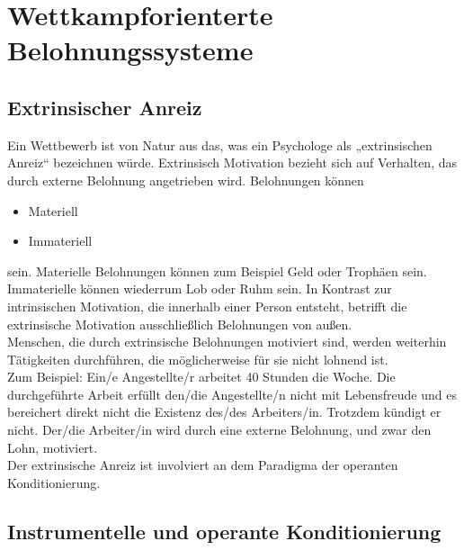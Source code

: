 \chapter{Wettkampforienterte Belohnungssysteme}
\reiter
 
	\section{Extrinsischer Anreiz}
	
Ein Wettbewerb ist von Natur aus das, was ein Psychologe als „extrinsischen Anreiz“ bezeichnen würde.
Extrinsisch Motivation bezieht sich auf Verhalten, das durch externe Belohnung angetrieben wird. Belohnungen können 
  
		\begin{itemize}
			\item Materiell
  		\item Immateriell
		\end{itemize}
		
sein. Materielle Belohnungen können zum Beispiel Geld oder Trophäen sein. Immaterielle können wiederrum Lob oder Ruhm sein. In Kontrast zur intrinsischen Motivation, die innerhalb einer Person entsteht, betrifft die extrinsische Motivation ausschließlich Belohnungen von außen. \\

Menschen, die durch extrinsische Belohnungen motiviert sind, werden weiterhin Tätigkeiten durchführen, die möglicherweise für sie nicht lohnend ist. \\
Zum Beispiel: Ein/e Angestellte/r arbeitet 40 Stunden die Woche. Die durchgeführte Arbeit erfüllt den/die Angestellte/n nicht mit Lebensfreude und es bereichert direkt nicht die Existenz des/des Arbeiters/in. Trotzdem kündigt er nicht. Der/die Arbeiter/in wird durch eine externe Belohnung, und zwar den Lohn, motiviert. \\
Der extrinsische Anreiz ist involviert an dem Paradigma der operanten Konditionierung. \\



	\section{Instrumentelle und operante Konditionierung}
	
